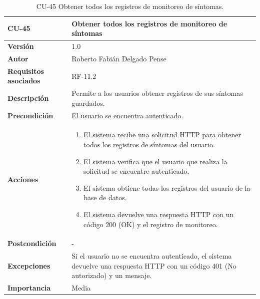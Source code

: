 \begin{table}[p]
	\centering
	\begin{tabularx}{\linewidth}{ p{} p{} }
		\toprule
		\textbf{CU-45}    & \textbf{Obtener todos los registros de monitoreo de síntomas}\\
		\toprule
		\textbf{Versión}              & 1.0    \\
		\textbf{Autor}                & Roberto Fabián Delgado Pense \\
		\textbf{Requisitos asociados} & RF-11.2 \\ 
		\textbf{Descripción}          & Permite a los usuarios obtener registros de sus síntomas guardados. \\
		\textbf{Precondición}         & El usuario se encuentra autenticado. \\  
		\textbf{Acciones}             &
		\begin{enumerate}
			\def\labelenumi{\arabic{enumi}.}
			\tightlist
			\item El sistema recibe una solicitud HTTP para obtener todos los registros de síntomas del usuario.
                \item El sistema verifica que el usuario que realiza la solicitud se encuentre autenticado.
			\item El sistema obtiene todas los registros del usuario de la base de datos.
                \item El sistema devuelve una respuesta HTTP con un código 200 (OK) y el registro de monitoreo.         
            \end{enumerate}\\
		\textbf{Postcondición}        & -  \\
		\textbf{Excepciones}          &  Si el usuario no se encuentra autenticado, el 
                    sistema devuelve una respuesta HTTP con un código 401 (No autorizado) y un mensaje.\\
		\textbf{Importancia}          & Media \\
		\bottomrule
	\end{tabularx}
	\caption{CU-45 Obtener todos los registros de monitoreo de síntomas.}
\end{table}

